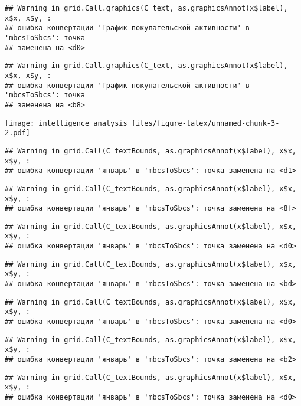 \documentclass[
]{article}
\begin{document}
\begin{verbatim}
## Warning in grid.Call.graphics(C_text, as.graphicsAnnot(x$label), x$x, x$y, :
## ошибка конвертации 'График покупательской активности' в 'mbcsToSbcs': точка
## заменена на <d0>
\end{verbatim}

\begin{verbatim}
## Warning in grid.Call.graphics(C_text, as.graphicsAnnot(x$label), x$x, x$y, :
## ошибка конвертации 'График покупательской активности' в 'mbcsToSbcs': точка
## заменена на <b8>
\end{verbatim}

\texttt{[image: intelligence\_analysis\_files/figure-latex/unnamed-chunk-3-2.pdf]}

\begin{verbatim}
## Warning in grid.Call(C_textBounds, as.graphicsAnnot(x$label), x$x, x$y, :
## ошибка конвертации 'январь' в 'mbcsToSbcs': точка заменена на <d1>
\end{verbatim}

\begin{verbatim}
## Warning in grid.Call(C_textBounds, as.graphicsAnnot(x$label), x$x, x$y, :
## ошибка конвертации 'январь' в 'mbcsToSbcs': точка заменена на <8f>
\end{verbatim}

\begin{verbatim}
## Warning in grid.Call(C_textBounds, as.graphicsAnnot(x$label), x$x, x$y, :
## ошибка конвертации 'январь' в 'mbcsToSbcs': точка заменена на <d0>
\end{verbatim}

\begin{verbatim}
## Warning in grid.Call(C_textBounds, as.graphicsAnnot(x$label), x$x, x$y, :
## ошибка конвертации 'январь' в 'mbcsToSbcs': точка заменена на <bd>
\end{verbatim}

\begin{verbatim}
## Warning in grid.Call(C_textBounds, as.graphicsAnnot(x$label), x$x, x$y, :
## ошибка конвертации 'январь' в 'mbcsToSbcs': точка заменена на <d0>
\end{verbatim}

\begin{verbatim}
## Warning in grid.Call(C_textBounds, as.graphicsAnnot(x$label), x$x, x$y, :
## ошибка конвертации 'январь' в 'mbcsToSbcs': точка заменена на <b2>
\end{verbatim}

\begin{verbatim}
## Warning in grid.Call(C_textBounds, as.graphicsAnnot(x$label), x$x, x$y, :
## ошибка конвертации 'январь' в 'mbcsToSbcs': точка заменена на <d0>
\end{verbatim}
\end{document}
